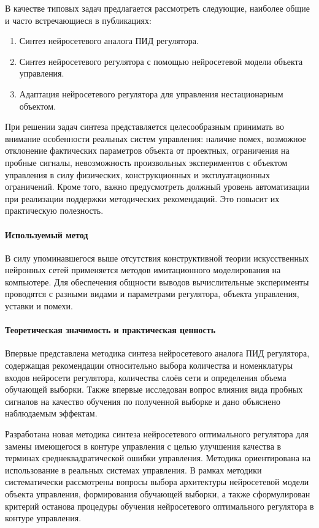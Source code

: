 В качестве типовых задач предлагается рассмотреть следующие, наиболее
общие и часто встречающиеся в публикациях:
\begin{enumerate}
\item Синтез нейросетевого аналога ПИД регулятора.
\item Синтез нейросетевого регулятора с помощью нейросетевой модели
  объекта управления.
\item Адаптация нейросетевого регулятора для управления нестационарным
  объектом.
\end{enumerate}

При решении задач синтеза представляется целесообразным принимать во
внимание особенности реальных систем управления: наличие помех,
возможное отклонение фактических параметров объекта от проектных,
ограничения на пробные сигналы, невозможность произвольных
экспериментов с объектом управления в силу физических, конструкционных
и эксплуатационных ограничений.  Кроме того, важно предусмотреть
должный уровень автоматизации при реализации поддержки методических
рекомендаций.  Это повысит их практическую полезность.

\paragraph{Используемый метод}

В силу упоминавшегося выше отсутствия конструктивной теории
искусственных нейронных сетей применяется методов имитационного
моделирования на компьютере.  Для обеспечения общности выводов
вычислительные эксперименты проводятся с разными видами и параметрами
регулятора, объекта управления, уставки и помехи.

\paragraph{Теоретическая значимость и практическая ценность}

Впервые представлена методика синтеза нейросетевого аналога ПИД
регулятора, содержащая рекомендации относительно выбора количества и
номенклатуры входов нейросети регулятора, количества слоёв сети и
определения объема обучающей выборки.  Также впервые исследован вопрос
влияния вида пробных сигналов на качество обучения по полученной
выборке и дано объяснено наблюдаемым эффектам.

Разработана новая методика синтеза нейросетевого оптимального
регулятора для замены имеющегося в контуре управления с целью
улучшения качества в терминах среднеквадратической ошибки управления.
Методика ориентирована на использование в реальных системах
управления.  В рамках методики систематически рассмотрены вопросы
выбора архитектуры нейросетевой модели объекта управления,
формирования обучающей выборки, а также сформулирован критерий
останова процедуры обучения нейросетевого оптимального регулятора в
контуре управления.

